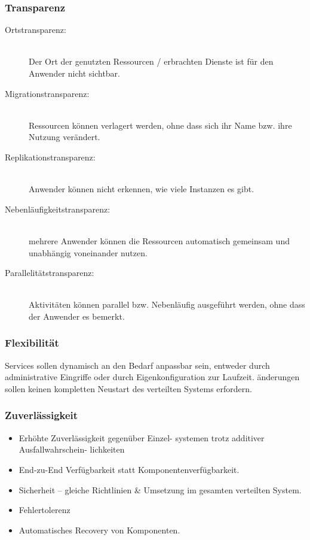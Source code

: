 \documentclass[a4paper, 10pt]{article}
\begin{document}
\subsubsection{Transparenz}
\begin{description}
	\item[Ortstransparenz:] \hfill \\ Der Ort der genutzten Ressourcen / erbrachten Dienste ist f\"ur den Anwender nicht sichtbar.
	\item[Migrationstransparenz:] \hfill \\ Ressourcen können verlagert werden, ohne dass sich ihr Name bzw. ihre Nutzung ver\"andert.
	\item[Replikationstransparenz:] \hfill \\ Anwender können nicht erkennen, wie viele Instanzen es gibt.
	\item[Nebenl\"aufigkeitstransparenz:] \hfill \\ mehrere Anwender können die Ressourcen automatisch gemeinsam und unabh\"angig voneinander nutzen.
	\item[Parallelit\"atstransparenz:] \hfill \\ Aktivit\"aten können parallel bzw. Nebenl\"aufig ausgef\"uhrt werden, ohne dass der Anwender es bemerkt.
\end{description}

\subsubsection{Flexibilit\"at}
Services sollen dynamisch an den Bedarf anpassbar sein, entweder durch administrative Eingriffe oder durch Eigenkonfiguration zur Laufzeit. \"anderungen sollen keinen kompletten Neustart des verteilten Systems erfordern.

\subsubsection{Zuverl\"assigkeit}
\begin{itemize}
	\item Erhöhte Zuverl\"assigkeit gegen\"uber Einzel- systemen trotz additiver Ausfallwahrschein- lichkeiten
	\item End-zu-End Verf\"ugbarkeit statt Komponentenverf\"ugbarkeit.
	\item Sicherheit – gleiche Richtlinien \& Umsetzung im gesamten verteilten System.
	\item Fehlertolerenz
	\item Automatisches Recovery von Komponenten.
\end{itemize}
\end{document}
